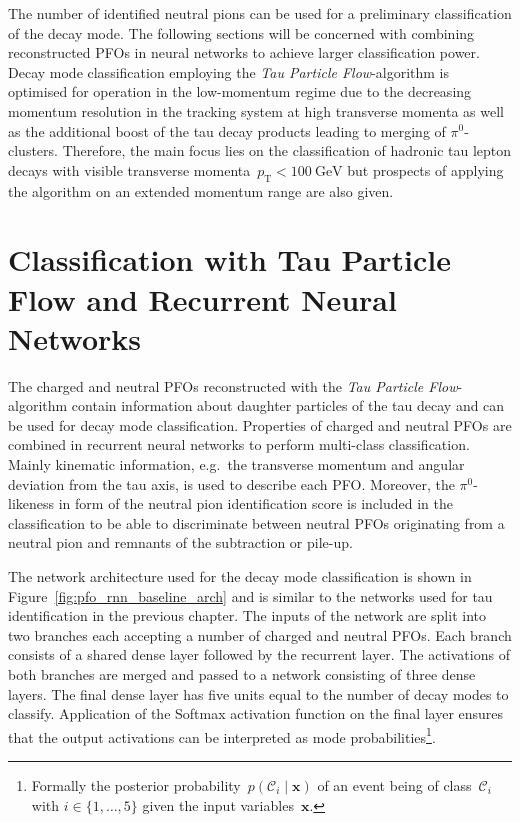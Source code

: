 The number of identified neutral pions can be used for a preliminary
classification of the decay mode. The following sections will be concerned with
combining reconstructed PFOs in neural networks to achieve larger classification
power. Decay mode classification employing the \emph{Tau Particle
  Flow}-algorithm is optimised for operation in the low-momentum regime due to
the decreasing momentum resolution in the tracking system at high transverse
momenta as well as the additional boost of the tau decay products leading to
merging of $\pi^0$-clusters. Therefore, the main focus lies on the
classification of hadronic tau lepton decays with visible transverse
momenta~$p_\text{T} < \SI{100}{\giga\electronvolt}$ but prospects of applying
the algorithm on an extended momentum range are also given. 

\section{Classification with Tau Particle Flow and Recurrent Neural Networks}
\label{sec:pfo_general}

The charged and neutral PFOs reconstructed with the \emph{Tau Particle
  Flow}-algorithm contain information about daughter particles of the tau decay
and can be used for decay mode classification. Properties of charged and neutral
PFOs are combined in recurrent neural networks to perform multi-class
classification. Mainly kinematic information, e.g.\ the transverse momentum and
angular deviation from the tau axis, is used to describe each PFO. Moreover, the
$\pi^0$-likeness in form of the neutral pion identification score is included in
the classification to be able to discriminate between neutral PFOs originating
from a neutral pion and remnants of the subtraction or pile-up.

The network architecture used for the decay mode classification is shown in
Figure~\ref{fig:pfo_rnn_baseline_arch} and is similar to the networks used for
tau identification in the previous chapter. The inputs of the network are split
into two branches each accepting a number of charged and neutral PFOs. Each
branch consists of a shared dense layer followed by the recurrent layer. The
activations of both branches are merged and passed to a network consisting of
three dense layers. The final dense layer has five units equal to the number of
decay modes to classify. Application of the Softmax activation function on the
final layer ensures that the output activations can be interpreted as mode
probabilities\footnote{Formally the posterior
  probability~$p(\mathcal{C}_i \mid \mathbf{x})$ of an event being of
  class~$\mathcal{C}_i$ with $i \in \{1, \dots, 5 \}$ given the input
  variables~$\mathbf{x}$.}.

